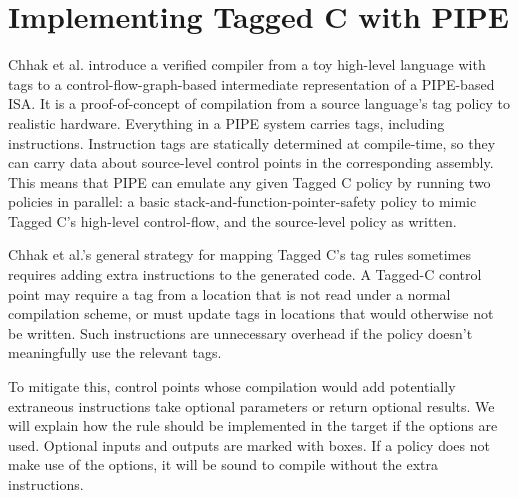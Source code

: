 \documentclass{llncs}
\begin{document}

                         
  


\section{Implementing Tagged C with PIPE}
\label{sec:optionals}

Chhak et al. \cite{Chhak21:Tagine} introduce a verified compiler from a toy
high-level language with tags
to a control-flow-graph-based intermediate representation of a PIPE-based
ISA. It is a proof-of-concept of compilation from a source language's tag policy to
realistic hardware. Everything in a PIPE system carries tags, including instructions. 
Instruction tags are statically determined at compile-time, so they can carry data about source-level
control points in the corresponding assembly. This means that PIPE can emulate any given Tagged C
policy by running two policies in parallel: a basic stack-and-function-pointer-safety policy to mimic Tagged C's
high-level control-flow, and the source-level policy as written.

Chhak et al.'s general strategy for mapping Tagged C's tag rules sometimes requires adding extra
instructions to the generated code. A Tagged-C control point
may require a tag from a location that is not read under a normal compilation scheme, or must update tags
in locations that would otherwise not be written. Such instructions are unnecessary overhead if the policy
doesn't meaningfully use the relevant tags.

To mitigate this, control points whose compilation would add potentially extraneous instructions
take optional parameters or return optional results. We will explain how the rule should be
implemented in the target if the options are used.
Optional inputs and outputs are marked with boxes. If a policy does not make use of the options, it will
be sound to compile without the extra instructions.
\end{document}
